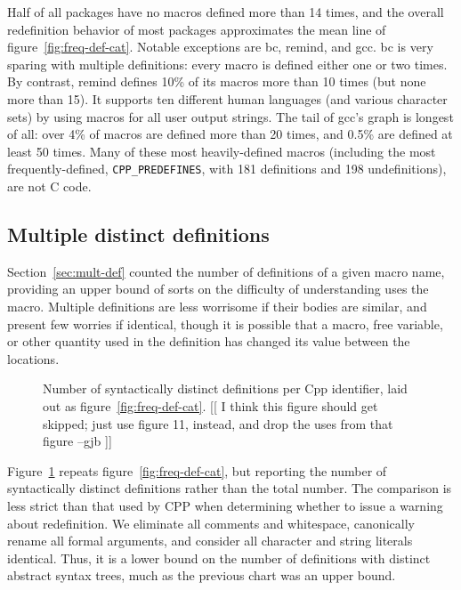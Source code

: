 \documentclass[10pt]{article}
\newcommand{\pkg}[1]{\textsf{#1}}
\begin{document}
Half of all packages have no macros defined more than 14 times, and the
overall redefinition behavior of most packages approximates the mean line
of figure~\ref{fig:freq-def-cat}.  Notable exceptions are \pkg{bc},
\pkg{remind}, and \pkg{gcc}.  \pkg{bc} is very sparing with multiple
definitions: every macro is defined either one or two times.  By contrast, 
\pkg{remind} defines 10\% of its macros more than 10 times (but none more
than 15).  It supports ten different human languages (and various character
sets) by using macros for all user output strings.
The tail of \pkg{gcc}'s graph is longest of all:  over 4\% of macros are
defined more than 20 times, and 0.5\% are defined at least 50 times.
Many of these most heavily-defined macros (including the most
frequently-defined, \verb|CPP_PREDEFINES|, with  181 definitions and 198
undefinitions), are not C code.



        

\subsection{Multiple distinct definitions}

Section~\ref{sec:mult-def} counted the number of definitions of a given
macro name, providing an upper bound of sorts on the difficulty of
understanding uses the macro.  Multiple definitions are less worrisome if
their bodies are similar, and present few worries if identical, though it
is possible that a macro, free variable, or other quantity used in the
definition has changed its value between the locations.

\begin{figure}
  \centerline{}
  \caption{Number of syntactically distinct definitions per Cpp identifier,
    laid out as figure~\ref{fig:freq-def-cat}. [[ I think this figure
    should get skipped; just use figure 11, instead, and drop the uses
    from that figure --gjb ]]}
  \label{fig:freq-ddf-cat}
\end{figure}
        
Figure~\ref{fig:freq-ddf-cat} repeats figure~\ref{fig:freq-def-cat}, but
reporting the number of syntactically distinct definitions rather than the
total number.  The comparison is less strict than that used by CPP when
determining whether to issue a warning about redefinition.  We eliminate
all comments and whitespace, canonically rename all formal arguments, and
consider all character and string literals identical.  Thus, it is a lower
bound on the number of definitions with distinct abstract syntax trees,
much as the previous chart was an upper bound.
\end{document}
